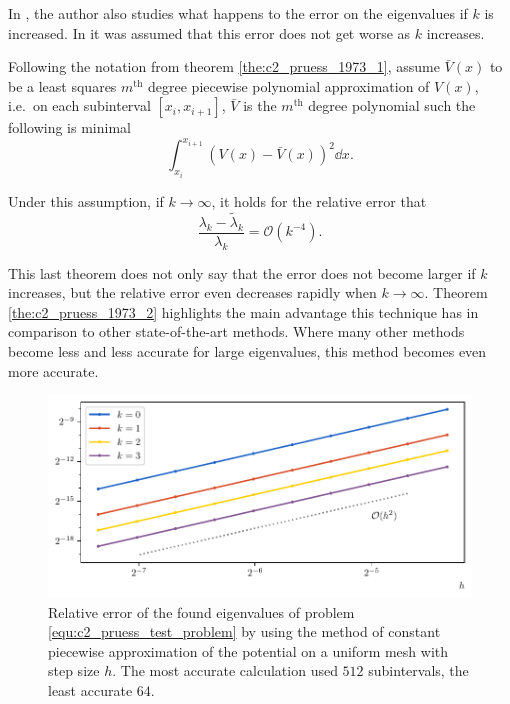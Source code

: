In \cite{pruess_estimating_1973}, the author also studies what happens to the error on the eigenvalues if $k$ is increased. In \cite{canosa_new_1970} it was assumed that this error does not get worse as $k$ increases.

\begin{theorem}[Pruess 1973]\label{the:c2_pruess_1973_2}
    Following the notation from theorem \ref{the:c2_pruess_1973_1}, assume $\bar{V}(x)$ to be a least squares $m^\text{th}$ degree piecewise polynomial approximation of $V(x)$, i.e.~on each subinterval $[x_i, x_{i+1}]$, $\bar{V}$ is the $m^\text{th}$ degree polynomial such the following is minimal
    $$
        \int_{x_i}^{x_{i+1}} \left(V(x) - \bar{V}(x)\right)^2 \dd x \text{.}
    $$

    Under this assumption, if $k \to \infty$, it holds for the relative error that
    $$
        \frac{\lambda_k - \tilde{\lambda}_k}{\lambda_k} = \mathcal{O}(k^{-4})\text{.}
    $$
\end{theorem}

This last theorem does not only say that the error does not become larger if $k$ increases, but the relative error even decreases rapidly when $k \to \infty$. Theorem \ref{the:c2_pruess_1973_2} highlights the main advantage this technique has in comparison to other state-of-the-art methods. Where many other methods become less and less accurate for large eigenvalues, this method becomes even more accurate.

\begin{figure}
    \begin{center}
        \includegraphics[width=\textwidth]{img/chapter2/pruess_h_error.pdf}
    \end{center}
    \caption{Relative error of the found eigenvalues of problem \eqref{equ:c2_pruess_test_problem} by using the method of constant piecewise approximation of the potential on a uniform mesh with step size $h$. The most accurate calculation used $512$ subintervals, the least accurate $64$.}
    \label{fig:c2_pruess_h_error}
\end{figure}


